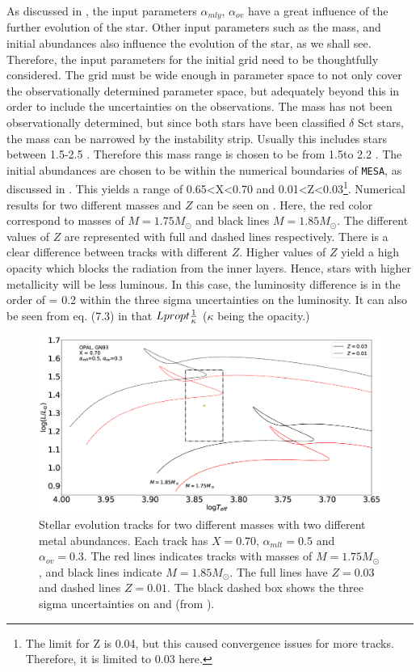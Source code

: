 As discussed in , the input parameters $\alpha_{mly}$, $\alpha_{ov}$ have a great influence of the further evolution of the star. Other input parameters such as the mass, and initial abundances also influence the evolution of the star, as we shall see. Therefore, the input parameters for the initial grid need to be thoughtfully considered.  The grid must be wide enough in parameter space to not only cover the observationally determined parameter space, but adequately beyond this in order to include the uncertainties on the observations.
The mass has not been observationally determined, but since both stars have been classified $\delta$ Sct stars, the mass can be narrowed by the instability strip. Usually this includes stars between 1.5-2.5 \msun. Therefore this mass range is chosen to be from 1.5\msun to 2.2 \msun. The initial abundances are chosen to be within the numerical boundaries of \texttt{MESA}, as discussed in . This yields a range of 0.65<X<0.70 and 0.01<Z<0.03\footnote{The limit for Z is 0.04, but this caused convergence issues for more tracks. Therefore, it is limited to 0.03 here.}. Numerical results for two different masses and $Z$ can be seen on . Here, the red color correspond to masses of $M=1.75M_\odot$ and black lines $M=1.85M_\odot$. The different values of $Z$ are represented with full and dashed lines respectively. There is a clear difference between tracks with different $Z$. Higher values of $Z$ yield a high opacity which blocks the radiation from the inner layers. Hence, stars with higher metallicity will be less luminous. In this case, the luminosity difference is in the order of \lum = 0.2 within the three sigma uncertainties on the luminosity.  It can also be seen from eq. (7.3) in \citet{christensen2008lecture} that $L \\propt \frac{1}{\kappa}$ ($\kappa$ being the opacity.)


\begin{figure}[htbp]
	\centering
	\includegraphics[width=1\textwidth]{test_z.eps}
	\caption{Stellar evolution tracks for two different masses with two different metal abundances. Each track has $X=0.70$, $\alpha_{mlt}=0.5$ and $\alpha_{ov}=0.3$. The red lines indicates tracks with masses of $M=1.75M_\odot$, and black lines indicate $M=1.85M_\odot$. The full lines have $Z = 0.03$ and dashed lines $Z = 0.01$. The black dashed box shows the three sigma uncertainties on \lum and \teff (from \citet{lenz2010delta}). }
	\label{diffz}
\end{figure}


